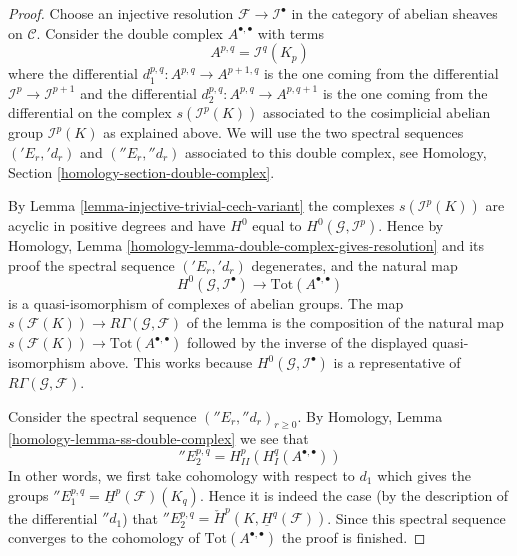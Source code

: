 \documentclass[10pt,a4paper]{amsart}
\theoremstyle{plain}
\theoremstyle{definition}
\theoremstyle{remark}
\numberwithin{equation}{subsection}
\begin{document}
\begin{proof}
Choose an injective resolution $\mathcal{F} \to \mathcal{I}^\bullet$
in the category of abelian sheaves on $\mathcal{C}$. Consider the
double complex $A^{\bullet, \bullet}$ with terms
$$
A^{p, q} = \mathcal{I}^q(K_p)
$$
where the differential $d_1^{p, q} : A^{p, q} \to A^{p + 1, q}$
is the one coming from the differential $\mathcal{I}^p \to \mathcal{I}^{p + 1}$
and the differential $d_2^{p, q} : A^{p, q} \to A^{p, q + 1}$ is the
one coming from the differential on the complex
$s(\mathcal{I}^p(K))$ associated to the cosimplicial abelian group
$\mathcal{I}^p(K)$ as explained above.
We will use the two spectral
sequences $({}'E_r, {}'d_r)$ and $({}''E_r, {}''d_r)$
associated to this double complex, see
Homology, Section \ref{homology-section-double-complex}.

\medskip\noindent
By Lemma \ref{lemma-injective-trivial-cech-variant} the complexes
$s(\mathcal{I}^p(K))$ are acyclic in positive degrees and have
$H^0$ equal to $H^0(\mathcal{G}, \mathcal{I}^p)$. Hence by
Homology, Lemma \ref{homology-lemma-double-complex-gives-resolution}
and its proof the spectral sequence $({}'E_r, {}'d_r)$ degenerates,
and the natural map
$$
H^0(\mathcal{G}, \mathcal{I}^\bullet) \longrightarrow
\text{Tot}(A^{\bullet, \bullet})
$$
is a quasi-isomorphism of complexes of abelian groups. The map
$s(\mathcal{F}(K)) \longrightarrow R\Gamma(\mathcal{G}, \mathcal{F})$
of the lemma is the composition of the natural map
$s(\mathcal{F}(K)) \to \text{Tot}(A^{\bullet, \bullet})$
followed by the inverse of the displayed quasi-isomorphism above.
This works because $H^0(\mathcal{G}, \mathcal{I}^\bullet)$
is a representative of $R\Gamma(\mathcal{G}, \mathcal{F})$.

\medskip\noindent
Consider the spectral sequence $({}''E_r, {}''d_r)_{r \geq 0}$. By
Homology, Lemma \ref{homology-lemma-ss-double-complex}
we see that
$$
{}''E_2^{p, q} = H^p_{II}(H^q_I(A^{\bullet, \bullet}))
$$
In other words, we first take cohomology with respect to
$d_1$ which gives the groups
${}''E_1^{p, q} = \underline{H}^p(\mathcal{F})(K_q)$.
Hence it is indeed the case (by the description of the differential
${}''d_1$) that
${}''E_2^{p, q} = \check{H}^p(K, \underline{H}^q(\mathcal{F}))$.
Since this spectral sequence converges to the cohomology of
$\text{Tot}(A^{\bullet, \bullet})$ the proof is finished.
\end{proof}
\end{document}

